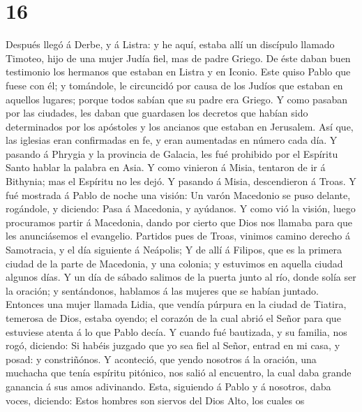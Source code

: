\hypertarget{section-15}{%
\section{16}\label{section-15}}

 Después llegó á Derbe, y á Listra: y he aquí, estaba allí
un discípulo llamado Timoteo, hijo de una mujer Judía fiel, mas de padre
Griego.  De éste daban buen testimonio los hermanos que
estaban en Listra y en Iconio.  Este quiso Pablo que fuese
con él; y tomándole, le circuncidó por causa de los Judíos que estaban
en aquellos lugares; porque todos sabían que su padre era Griego.
 Y como pasaban por las ciudades, les daban que guardasen
los decretos que habían sido determinados por los apóstoles y los
ancianos que estaban en Jerusalem.  Así que, las iglesias
eran confirmadas en fe, y eran aumentadas en número cada día.
 Y pasando á Phrygia y la provincia de Galacia, les fué
prohibido por el Espíritu Santo hablar la palabra en Asia. 
Y como vinieron á Misia, tentaron de ir á Bithynia; mas el Espíritu no
les dejó.  Y pasando á Misia, descendieron á Troas.
 Y fué mostrada á Pablo de noche una visión: Un varón
Macedonio se puso delante, rogándole, y diciendo: Pasa á Macedonia, y
ayúdanos.  Y como vió la visión, luego procuramos partir á
Macedonia, dando por cierto que Dios nos llamaba para que les
anunciásemos el evangelio.  Partidos pues de Troas, vinimos
camino derecho á Samotracia, y el día siguiente á Neápolis;
 Y de allí á Filipos, que es la primera ciudad de la parte
de Macedonia, y una colonia; y estuvimos en aquella ciudad algunos días.
 Y un día de sábado salimos de la puerta junto al río,
donde solía ser la oración; y sentándonos, hablamos á las mujeres que se
habían juntado.  Entonces una mujer llamada Lidia, que
vendía púrpura en la ciudad de Tiatira, temerosa de Dios, estaba oyendo;
el corazón de la cual abrió el Señor para que estuviese atenta á lo que
Pablo decía.  Y cuando fué bautizada, y su familia, nos
rogó, diciendo: Si habéis juzgado que yo sea fiel al Señor, entrad en mi
casa, y posad: y constriñónos.  Y aconteció, que yendo
nosotros á la oración, una muchacha que tenía espíritu pitónico, nos
salió al encuentro, la cual daba grande ganancia á sus amos adivinando.
 Esta, siguiendo á Pablo y á nosotros, daba voces,
diciendo: Estos hombres son siervos del Dios Alto, los cuales os
